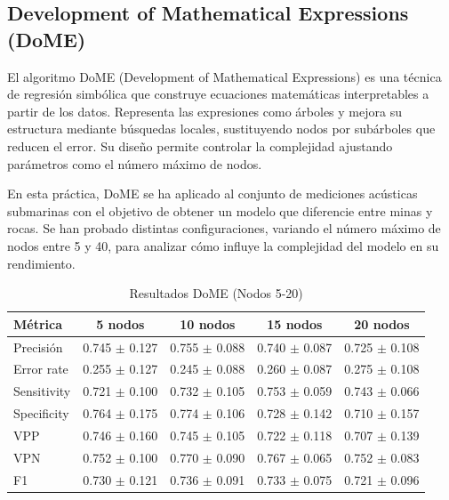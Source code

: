 \documentclass[a4paper,10pt]{article}
\begin{document}
    
    
    \newpage
    \subsection{Development of Mathematical Expressions (DoME)}
    El algoritmo DoME (Development of Mathematical Expressions) es una técnica de regresión simbólica que construye ecuaciones matemáticas interpretables a partir de los datos. Representa las expresiones como árboles y mejora su estructura mediante búsquedas locales, sustituyendo nodos por subárboles que reducen el error. Su diseño permite controlar la complejidad ajustando parámetros como el número máximo de nodos.

    En esta práctica, DoME se ha aplicado al conjunto de mediciones acústicas submarinas con el objetivo de obtener un modelo que diferencie entre minas y rocas. Se han probado distintas configuraciones, variando el número máximo de nodos entre 5 y 40, para analizar cómo influye la complejidad del modelo en su rendimiento.
    
    \begin{table}[h!]
    \centering
    \caption{Resultados DoME (Nodos 5-20)}
    \begin{tabular}{lcccc}
    \toprule
    Métrica & 5 nodos & 10 nodos & 15 nodos & 20 nodos \\
    \midrule
    Precisión & 0.745 $\pm$ 0.127 & 0.755 $\pm$ 0.088 & 0.740 $\pm$ 0.087 & 0.725 $\pm$ 0.108 \\
    Error rate & 0.255 $\pm$ 0.127 & 0.245 $\pm$ 0.088 & 0.260 $\pm$ 0.087 & 0.275 $\pm$ 0.108 \\
    Sensitivity & 0.721 $\pm$ 0.100 & 0.732 $\pm$ 0.105 & 0.753 $\pm$ 0.059 & 0.743 $\pm$ 0.066 \\
    Specificity & 0.764 $\pm$ 0.175 & 0.774 $\pm$ 0.106 & 0.728 $\pm$ 0.142 & 0.710 $\pm$ 0.157 \\
    VPP & 0.746 $\pm$ 0.160 & 0.745 $\pm$ 0.105 & 0.722 $\pm$ 0.118 & 0.707 $\pm$ 0.139 \\
    VPN & 0.752 $\pm$ 0.100 & 0.770 $\pm$ 0.090 & 0.767 $\pm$ 0.065 & 0.752 $\pm$ 0.083 \\
    F1 & 0.730 $\pm$ 0.121 & 0.736 $\pm$ 0.091 & 0.733 $\pm$ 0.075 & 0.721 $\pm$ 0.096 \\
    \bottomrule
    \end{tabular}
    \label{tab:dome_5_20}
    \end{table}
    
\end{document}
